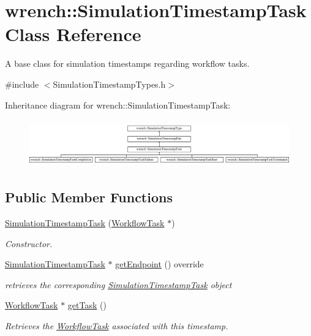 \hypertarget{classwrench_1_1_simulation_timestamp_task}{}\section{wrench\+:\+:Simulation\+Timestamp\+Task Class Reference}
\label{classwrench_1_1_simulation_timestamp_task}


A base class for simulation timestamps regarding workflow tasks.  




{\ttfamily \#include $<$Simulation\+Timestamp\+Types.\+h$>$}

Inheritance diagram for wrench\+:\+:Simulation\+Timestamp\+Task\+:\begin{figure}[H]
\begin{center}
\leavevmode
\includegraphics[height=2.066421cm]{classwrench_1_1_simulation_timestamp_task}
\end{center}
\end{figure}
\subsection*{Public Member Functions}
\begin{DoxyCompactItemize}
\item 
\hyperlink{classwrench_1_1_simulation_timestamp_task_a775bc576001c6a4c94e9ce33890e3aa0}{Simulation\+Timestamp\+Task} (\hyperlink{classwrench_1_1_workflow_task}{Workflow\+Task} $\ast$)
\begin{DoxyCompactList}\small\item\em Constructor. \end{DoxyCompactList}\item 
\hyperlink{classwrench_1_1_simulation_timestamp_task}{Simulation\+Timestamp\+Task} $\ast$ \hyperlink{classwrench_1_1_simulation_timestamp_task_af8e8da0d1710e20f4e517852c53cb1f2}{get\+Endpoint} () override
\begin{DoxyCompactList}\small\item\em retrieves the corresponding \hyperlink{classwrench_1_1_simulation_timestamp_task}{Simulation\+Timestamp\+Task} object \end{DoxyCompactList}\item 
\hyperlink{classwrench_1_1_workflow_task}{Workflow\+Task} $\ast$ \hyperlink{classwrench_1_1_simulation_timestamp_task_a9a9440d71940fccf0fb33383ce056a37}{get\+Task} ()
\begin{DoxyCompactList}\small\item\em Retrieves the \hyperlink{classwrench_1_1_workflow_task}{Workflow\+Task} associated with this timestamp. \end{DoxyCompactList}\end{DoxyCompactItemize}

